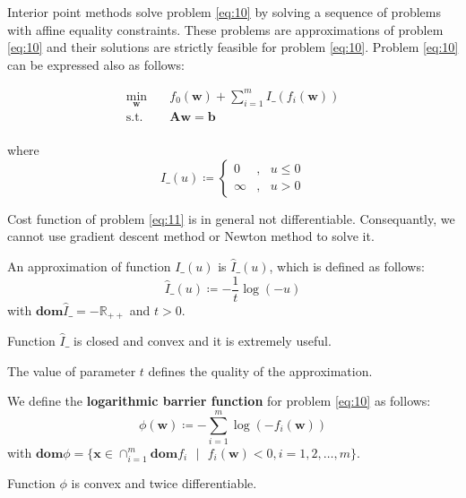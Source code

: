 \documentclass{beamer}
\begin{document}
\begin{frame}


\justifying
Interior point methods solve problem \eqref{eq:10} by solving a sequence of problems with affine equality constraints. These problems are approximations of problem \eqref{eq:10} and their solutions are strictly feasible for problem \eqref{eq:10}. Problem \eqref{eq:10} can be expressed also as follows:

\justifying
\begin{equation}
\begin{aligned}
\label{eq:11}
\min_{\mathbf{w}} \quad & {f_{0}\left(\mathbf{w}\right) + \sum_{i = 1}^{m} I{\_}\left(f_{i}\left(\mathbf{w}\right)\right)}\\
\textrm{s.t.} \quad & \mathbf{A}\mathbf{w} = \mathbf{b} \\
\end{aligned}
\end{equation}

\vspace{0.2cm}
\justifying
where
$$
I{\_}\left(u\right) \coloneqq
\left\{
	\begin{array}{ll}
		0  & , \textrm{ } u \leq 0 \\
		\infty & , \textrm{ } u > 0
	\end{array}
\right.
$$

\vspace{0.4cm}
\justifying
Cost function of problem \eqref{eq:11} is in general not differentiable. Consequantly, we cannot use gradient descent method or Newton method to solve it.

\end{frame}






\begin{frame}

\justifying
An approximation of function $I{\_}\left(u\right)$ is $\hat{I}{\_}\left(u\right)$, which is defined as follows:
$$
\hat{I}{\_}\left(u\right) \coloneqq -\frac{1}{t} \log\left(-u\right)
$$
with $\textbf{dom} \hat{I}{\_} = - \mathbb{R}_{++}$ and $t > 0$.

\vspace{0.4cm}
\justifying
Function $\hat{I}{\_}$ is closed and convex and it is extremely useful.

\vspace{0.4cm}
\justifying
The value of parameter $t$ defines the quality of the approximation.

\vspace{0.4cm}
\justifying
We define the \textbf{logarithmic barrier function} for problem \eqref{eq:10} as follows:
$$
\phi\left(\mathbf{w}\right) \coloneqq - \sum_{i = 1}^{m} \log\left(-f_{i}\left(\mathbf{w}\right)\right)
$$
with $\textbf{dom}\phi = \{\mathbf{x} \in \cap_{i=1}^{m} \textbf{dom} f_{i} \textrm{ } | \textrm{ } f_{i}\left(\mathbf{w}\right) < 0, i=1,2,\dots,m\}$.

\vspace{0.4cm}
\justifying
Function $\phi$ is convex and twice differentiable.

\end{frame}
\end{document}

